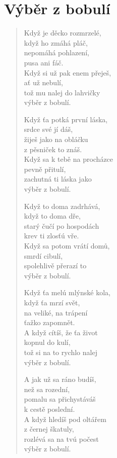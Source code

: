 \section{Výběr z bobulí}

\thispagestyle{empty}

\begin{multicols}{2}
	
\begin{verse}
		
Když je děcko rozmrzelé,\\
když ho zmáhá pláč,\\
nepomáhá pohlazení,\\
pusa ani fáč.\\
Když si už pak enem přeješ,\\
ať už nebulí,\\
tož mu nalej do lahvičky\\
výběr z bobulí.

Když ťa potká první láska,\\
srdce své jí dáš,\\
žiješ jako na obláčku\\
z pěsniček to znáš.\\
Když sa k tebě na procházce\\
pevně přitulí,\\
zachutná ti láska jako\\
výběr z bobulí.

Když to doma zadrhává,\\
když to doma dře,\\
starý čučí po hospodách\\
krev ti zlosťú vře.\\
Když sa potom vrátí domů,\\
smrdí cibulí,\\
spolehlivě přerazí to\\
výběr z bobulí.

Když ťa melú mlýnské kola,\\
když ťa mrzí svět,\\
na veliké, na trápení\\
ťažko zapomnět.\\
A když cítíš, že ťa život\\
kopnul do kulí,\\
tož si na to rychlo nalej\\
výběr z bobulí.

A jak už sa ráno budíš,\\
než sa rozední,\\
pomalu sa přichystáváš\\
k cestě poslední.\\
A když hledíš pod oltářem\\
z černej škatuly,\\
rozlévá sa na tvú počest\\
výběr z bobulí.
	
	
\end{verse}
	
\end{multicols}